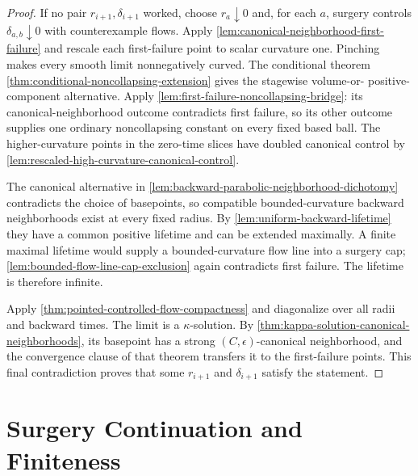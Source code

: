 \begin{proof}
If no pair $r_{i+1},\delta_{i+1}$ worked, choose
$r_a\downarrow0$ and, for each $a$, surgery controls
$\delta_{a,b}\downarrow0$ with counterexample flows.  Apply
\ref{lem:canonical-neighborhood-first-failure} and rescale each first-failure
point to scalar curvature one.  Pinching makes every smooth limit
nonnegatively curved.  The conditional theorem
\ref{thm:conditional-noncollapsing-extension} gives the stagewise volume-or-
positive-component alternative.  Apply
\ref{lem:first-failure-noncollapsing-bridge}: its canonical-neighborhood
outcome contradicts first failure, so its other outcome supplies one ordinary
noncollapsing constant on every fixed based ball.  The higher-curvature points
in the zero-time slices have doubled canonical control by
\ref{lem:rescaled-high-curvature-canonical-control}.

The canonical alternative in
\ref{lem:backward-parabolic-neighborhood-dichotomy} contradicts the choice
of basepoints, so compatible bounded-curvature backward neighborhoods exist
at every fixed radius.  By \ref{lem:uniform-backward-lifetime} they have a
common positive lifetime and can be extended maximally.  A finite maximal
lifetime would supply a bounded-curvature flow line into a surgery cap;
\ref{lem:bounded-flow-line-cap-exclusion} again contradicts first failure.
The lifetime is therefore infinite.

Apply \ref{thm:pointed-controlled-flow-compactness} and diagonalize over all
radii and backward times.  The limit is a $\kappa$-solution.
By \ref{thm:kappa-solution-canonical-neighborhoods}, its basepoint has a
strong $(C,\epsilon)$-canonical neighborhood, and the convergence clause of
that theorem transfers it to the first-failure points.  This final
contradiction proves that some $r_{i+1}$ and $\delta_{i+1}$ satisfy the
statement.
\end{proof}

\section{Surgery Continuation and Finiteness}

